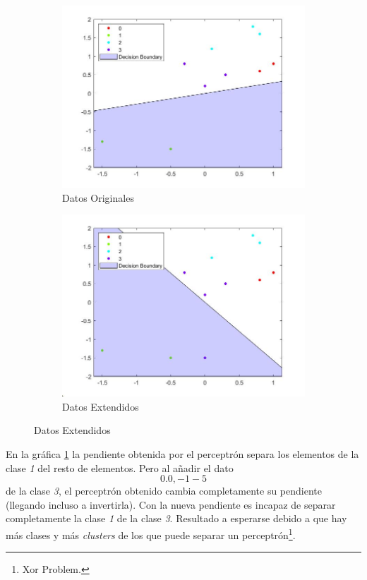 \documentclass{article}
\begin{document}
\begin{figure}[H]
 \centering
 \begin{subfigure}{0.45\textwidth}
  \includegraphics[width=0.9\linewidth]{../images/I_ex1_basicData.jpg}
  \caption{Datos Originales}
  \label{bs}
 \end{subfigure}
 \begin{subfigure}{0.45\textwidth}
  \includegraphics[width=0.9\linewidth]{../images/I_ex1_extendedData.jpg}
  \caption{Datos Extendidos}
  \label{ed}
 \end{subfigure}
\end{figure}

En la gráfica \hyperref[bs]{\ref{bs}} la pendiente obtenida por el perceptrón
separa los elementos de la clase \textit{1} del resto de elementos. Pero al
añadir el dato \texttt{\[0.0, -1-5\]} de la clase \textit{3}, el perceptrón
obtenido cambia completamente su pendiente (llegando incluso a invertirla). Con
la nueva pendiente es incapaz de separar completamente la clase \textit{1} de la
clase \textit{3}. Resultado a esperarse debido a que hay más clases y más
\textit{clusters} de los que puede separar un perceptrón\footnote{Xor Problem.}.
\end{document}

